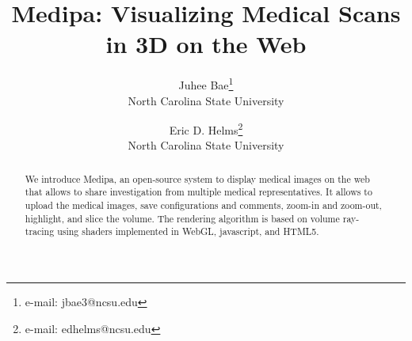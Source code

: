 \documentclass[annual]{acmsiggraph}
\title{Medipa: Visualizing Medical Scans in 3D on the Web}
\author{Juhee Bae\thanks{e-mail: jbae3@ncsu.edu}\\ North Carolina State University %
\and Eric D. Helms\thanks{e-mail: edhelms@ncsu.edu}\\North Carolina State University}
\begin{document}





\maketitle

\begin{abstract}
We introduce Medipa, an open-source system to display medical images on the web that allows to share investigation from multiple medical representatives. It allows to upload the medical images, save configurations and comments, zoom-in and zoom-out, highlight, and slice the volume. The rendering algorithm is based on volume ray-tracing using shaders implemented in WebGL, javascript, and HTML5.
\end{abstract}
\end{document}
